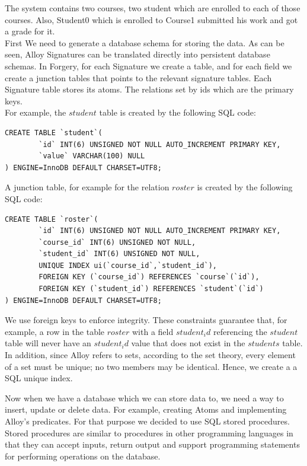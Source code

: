 \documentclass[oneside]{book}
\begin{document}
The system contains two courses, two student which are enrolled to each of those courses. Also, Student0 which is enrolled to Course1 submitted his work and got a grade for it.\\

First We need to generate a database schema for storing the data. As can be seen, Alloy Signatures can be translated directly into persistent database schemas. In Forgery, for each Signature we create a table, and for each field we create a junction tables that points to the relevant signature tables. Each Signature table stores its atoms. The relations set by ids which are the primary keys.\\

For example, the $student$ table is created by the following SQL code:

\begin{lstlisting}
CREATE TABLE `student`(
        `id` INT(6) UNSIGNED NOT NULL AUTO_INCREMENT PRIMARY KEY,
        `value` VARCHAR(100) NULL
) ENGINE=InnoDB DEFAULT CHARSET=UTF8;
\end{lstlisting}

A junction table, for example for the relation $roster$ is created by the following SQL code:

\begin{lstlisting}
CREATE TABLE `roster`(
        `id` INT(6) UNSIGNED NOT NULL AUTO_INCREMENT PRIMARY KEY,
        `course_id` INT(6) UNSIGNED NOT NULL,
        `student_id` INT(6) UNSIGNED NOT NULL,
        UNIQUE INDEX ui(`course_id`,`student_id`),
        FOREIGN KEY (`course_id`) REFERENCES `course`(`id`),
        FOREIGN KEY (`student_id`) REFERENCES `student`(`id`)
) ENGINE=InnoDB DEFAULT CHARSET=UTF8;
\end{lstlisting}

We use foreign keys to enforce integrity. These constraints guarantee that, for example, a row in the table $roster$ with a field $student_id$ referencing the $student$ table will never have an $student_id$ value that does not exist in the $students$ table. In addition, since Alloy refers to sets, according to the set theory, every element of a set must be unique; no two members may be identical. Hence, we create a a SQL unique index.

Now when we have a database which we can store data to, we need a way to insert, update or delete data. For example, creating Atoms and implementing Alloy's predicates. For that purpose we decided to use SQL stored procedures. Stored procedures are similar to procedures in other programming languages in that they can accept inputs, return output and support programming statements for performing operations on the database.\\
\end{document}

